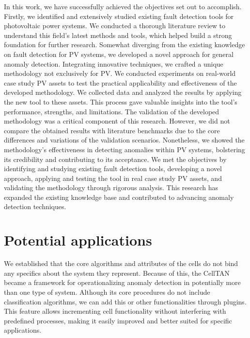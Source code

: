 In this work, we have successfully achieved the objectives set out to accomplish. Firstly, we identified and extensively studied existing fault detection tools for photovoltaic power systems. We conducted a thorough literature review to understand this field's latest methods and tools, which helped build a strong foundation for further research.
Somewhat diverging from the existing knowledge on fault detection for PV systems, we developed a novel approach for general anomaly detection. Integrating innovative techniques, we crafted a unique methodology not exclusively for PV.
We conducted experiments on real-world case study PV assets to test the practical applicability and effectiveness of the developed methodology. We collected data and analyzed the results by applying the new tool to these assets. This process gave valuable insights into the tool's performance, strengths, and limitations. The validation of the developed methodology was a critical component of this research. However, we did not compare the obtained results with literature benchmarks due to the core differences and variations of the validation scenarios. Nonetheless, we showed the methodology's effectiveness in detecting anomalies within PV systems, bolstering its credibility and contributing to its acceptance.
We met the objectives by identifying and studying existing fault detection tools, developing a novel approach, applying and testing the tool in real case study PV assets, and validating the methodology through rigorous analysis. This research has expanded the existing knowledge base and contributed to advancing anomaly detection techniques.


\section{Potential applications}


We established that the core algorithms and attributes of the cells do not bind any specifics about the system they represent. Because of this, the CellTAN became a framework for operationalizing anomaly detection in potentially more than one type of system. Although its core procedures do not include classification algorithms, we can add this or other functionalities through plugins. This feature allows incrementing cell functionality without interfering with predefined processes, making it easily improved and better suited for specific applications.

